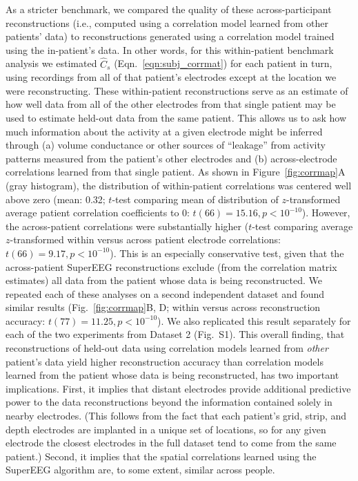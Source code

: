 \documentclass[11pt]{article}
\newcommand{\perexpcorrmaps}{S1}
\begin{document}
As a stricter benchmark, we compared the quality of these
across-participant reconstructions (i.e., computed using a correlation
model learned from other patients' data) to reconstructions generated
using a correlation model trained using the in-patient's data.  In
other words, for this within-patient benchmark analysis we estimated
$\hat{C}_{s}$ (Eqn.~\ref{eqn:subj_corrmat}) for each patient in turn,
using recordings from all of that patient's electrodes except at the
location we were reconstructing.  These within-patient reconstructions
serve as an estimate of how well data from all of the other electrodes
from that single patient may be used to estimate held-out data from
the same patient.  This allows us to ask how much information about
the activity at a given electrode might be inferred through (a) volume
conductance or other sources of ``leakage'' from activity patterns
measured from the patient's other electrodes and (b) across-electrode
correlations learned from that single patient.  As shown in
Figure~\ref{fig:corrmap}A (gray histogram), the distribution of
within-patient correlations was centered well above zero (mean: 0.32;
$t$-test comparing mean of distribution of $z$-transformed average
patient correlation coefficients to 0: $t(66) = 15.16, p < 10^{-10}$).
However, the across-patient correlations were substantially higher
($t$-test comparing average $z$-transformed within versus across
patient electrode correlations: $t(66) = 9.17, p < 10^{-10}$).  This
is an especially conservative test, given that the across-patient
SuperEEG reconstructions exclude (from the correlation matrix
estimates) all data from the patient whose data is being
reconstructed.  We repeated each of these analyses on a second
independent dataset and found similar results
(Fig.~\ref{fig:corrmap}B, D; within versus across reconstruction
accuracy: $t(77) = 11.25, p < 10^{-10}$). We also replicated this result
separately for each of the two experiments from Dataset 2
(Fig.~\perexpcorrmaps).  This overall finding, that reconstructions of
held-out data using correlation models learned from \textit{other}
patient's data yield higher reconstruction accuracy than correlation
models learned from the patient whose data is being reconstructed, has
two important implications.  First, it implies that distant electrodes
provide additional predictive power to the data reconstructions beyond
the information contained solely in nearby electrodes.  (This follows
from the fact that each patient's grid, strip, and depth electrodes
are implanted in a unique set of locations, so for any given electrode
the closest electrodes in the full dataset tend to come from the
same patient.)  Second, it implies that the spatial correlations
learned using the SuperEEG algorithm are, to some extent, similar
across people.
\end{document}
